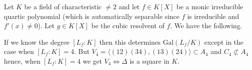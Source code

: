 \documentclass[12pt, a4paper]{article}
\newcommand{\gal}{\text{Gal}}
\begin{document}
\begin{mdprop}[Summary]
    Let \(K\) be a field of characteristic \(\neq 2\) and let \(f\in K[X]\) be a monic irreducible quartic polynomial (which is automatically separable since \(f\) is irreducible and \(f'(x)\neq 0\)). Let \(g \in K[X]\) be the cubic resolvent of \(f\). We have the following.
    \begin{center}
    \end{center}
\end{mdprop}

\begin{mdnote}
    If we know the degree \([L_f:K]\) then this determines \(\gal(L_f/K)\) except in the case when \([L_f:K]=4\). But \(V_4 = \langle (12)(34),(13)(24) \rangle \subset  A_4\) and \(C_4 \not\subset A_4\) hence, when \([L_f:K]=4\) we get \(V_4 \iff \Delta\) is a square in \(K\). 
\end{mdnote}
\end{document}
